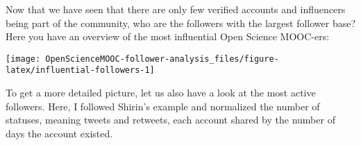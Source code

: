 \documentclass[]{article}
\newenvironment{Shaded}{\begin{snugshade}}{\end{snugshade}}
\newcommand{\KeywordTok}[1]{\textcolor[rgb]{0.13,0.29,0.53}{\textbf{#1}}}
\newcommand{\DataTypeTok}[1]{\textcolor[rgb]{0.13,0.29,0.53}{#1}}
\newcommand{\DecValTok}[1]{\textcolor[rgb]{0.00,0.00,0.81}{#1}}
\newcommand{\FloatTok}[1]{\textcolor[rgb]{0.00,0.00,0.81}{#1}}
\newcommand{\StringTok}[1]{\textcolor[rgb]{0.31,0.60,0.02}{#1}}
\newcommand{\CommentTok}[1]{\textcolor[rgb]{0.56,0.35,0.01}{\textit{#1}}}
\newcommand{\OtherTok}[1]{\textcolor[rgb]{0.56,0.35,0.01}{#1}}
\newcommand{\ControlFlowTok}[1]{\textcolor[rgb]{0.13,0.29,0.53}{\textbf{#1}}}
\newcommand{\OperatorTok}[1]{\textcolor[rgb]{0.81,0.36,0.00}{\textbf{#1}}}
\newcommand{\NormalTok}[1]{#1}
\begin{document}
Now that we have seen that there are only few verified accounts and
influencers being part of the community, who are the followers with the
largest follower base? Here you have an overview of the most influential
Open Science MOOC-ers:

\begin{Shaded}
\end{Shaded}

\begin{center}\texttt{[image: OpenScienceMOOC-follower-analysis\_files/figure-latex/influential-followers-1]} \end{center}

To get a more detailed picture, let us also have a look at the most
active followers. Here, I followed Shirin's example and normalized the
number of statuses, meaning tweets and retweets, each account shared by
the number of days the account existed.
\end{document}
